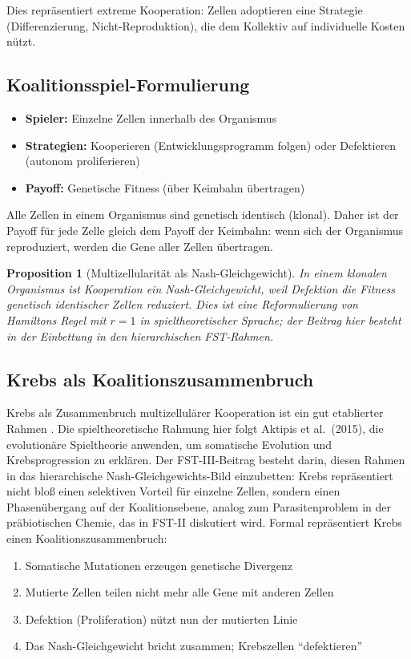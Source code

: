 \documentclass[12pt,a4paper]{article}
\newtheorem{proposition}{Proposition}
\theoremstyle{remark}
\begin{document}
Dies repr\"asentiert extreme Kooperation: Zellen adoptieren eine Strategie (Differenzierung, Nicht-Reproduktion), die dem Kollektiv auf individuelle Kosten n\"utzt.

\subsection{Koalitionsspiel-Formulierung}

\begin{itemize}
    \item \textbf{Spieler:} Einzelne Zellen innerhalb des Organismus
    \item \textbf{Strategien:} Kooperieren (Entwicklungsprogramm folgen) oder Defektieren (autonom proliferieren)
    \item \textbf{Payoff:} Genetische Fitness (\"uber Keimbahn \"ubertragen)
\end{itemize}

Alle Zellen in einem Organismus sind genetisch identisch (klonal). Daher ist der Payoff f\"ur jede Zelle gleich dem Payoff der Keimbahn: wenn sich der Organismus reproduziert, werden die Gene aller Zellen \"ubertragen.

\begin{proposition}[Multizellularit\"at als Nash-Gleichgewicht]
\label{prop:multicellularity}
In einem klonalen Organismus ist Kooperation ein Nash-Gleichgewicht, weil Defektion die Fitness genetisch identischer Zellen reduziert. Dies ist eine Reformulierung von Hamiltons Regel \citep{Hamilton1964} mit $r=1$ in spieltheoretischer Sprache; der Beitrag hier besteht in der Einbettung in den hierarchischen FST-Rahmen.
\end{proposition}

\subsection{Krebs als Koalitionszusammenbruch}

Krebs als Zusammenbruch multizellul\"arer Kooperation ist ein gut etablierter Rahmen \citep{AktipisCancer}. Die spieltheoretische Rahmung hier folgt Aktipis et al.\ (2015), die evolution\"are Spieltheorie anwenden, um somatische Evolution und Krebsprogression zu erkl\"aren. Der FST-III-Beitrag besteht darin, diesen Rahmen in das hierarchische Nash-Gleichgewichts-Bild einzubetten: Krebs repr\"asentiert nicht blo\ss{} einen selektiven Vorteil f\"ur einzelne Zellen, sondern einen Phasen\"ubergang auf der Koalitionsebene, analog zum Parasitenproblem in der pr\"abiotischen Chemie, das in FST-II diskutiert wird. Formal repr\"asentiert Krebs einen Koalitionszusammenbruch:
\begin{enumerate}
    \item Somatische Mutationen erzeugen genetische Divergenz
    \item Mutierte Zellen teilen nicht mehr alle Gene mit anderen Zellen
    \item Defektion (Proliferation) n\"utzt nun der mutierten Linie
    \item Das Nash-Gleichgewicht bricht zusammen; Krebszellen ``defektieren''
\end{enumerate}
\end{document}
